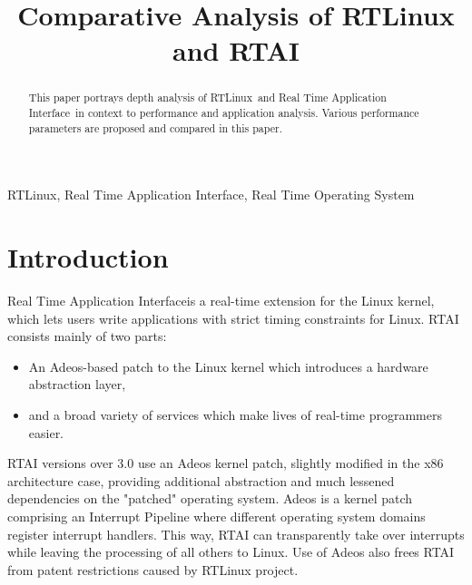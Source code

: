 \documentclass[conference]{IEEEtran}
\newcommand\rtos{Real Time Operating System}
\newcommand\rtai{Real Time Application Interface}
\newcommand\rtlinux{RTLinux}
\begin{document}
%
\title{Comparative Analysis of RTLinux and RTAI 
}

\author{
	\and
}


\maketitle
\IEEEdisplaynontitleabstractindextext
\IEEEpeerreviewmaketitle

\begin{abstract}
	This paper portrays depth analysis of \rtlinux\ and \rtai\ in context to performance and application analysis. Various performance parameters are proposed and compared in this paper.
\end{abstract}

\begin{IEEEkeywords}
	\rtlinux, \rtai, \rtos
\end{IEEEkeywords}

\section{Introduction}
\rtai is a real-time extension for the Linux kernel, which lets users write applications with strict timing constraints for Linux. RTAI consists mainly of two parts: 
\begin{itemize}
	\item[] An Adeos-based patch to the Linux kernel which introduces a hardware abstraction layer, 
	\item[] and a broad variety of services which make lives of real-time programmers easier. 
\end{itemize}
RTAI versions over 3.0 use an Adeos kernel patch, slightly modified in the x86 architecture case, providing additional abstraction and much lessened dependencies on the "patched" operating system. Adeos is a kernel patch comprising an Interrupt Pipeline where different operating system domains register interrupt handlers. This way, RTAI can transparently take over interrupts while leaving the processing of all others to Linux. Use of Adeos also frees RTAI from patent restrictions caused by RTLinux project.
\end{document}
